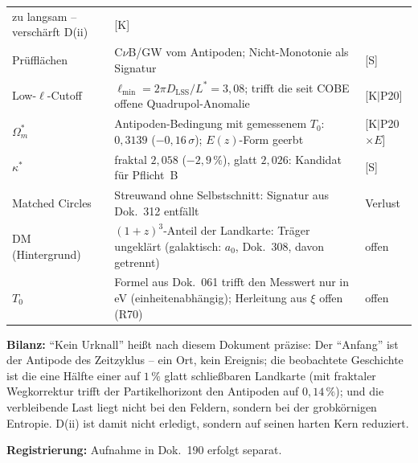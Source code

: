 {\begin{longtable}{lp{6.4cm}l}
  zu langsam -- verschärft D(ii) & [K] \\
Prüfflächen & C$\nu$B/GW vom Antipoden; Nicht-Monotonie als
  Signatur & [S] \\
Low-$\ell$-Cutoff & $\ell_\text{min} = 2\pi D_\text{LSS}/L^{*} =
  3{,}08$; trifft die seit COBE offene Quadrupol-Anomalie
  & [K$|$P20] \\
$\Omega_m^{*}$ & Antipoden-Bedingung mit gemessenem $T_0$:
  $0{,}3139$ ($-0{,}16\,\sigma$); $E(z)$-Form geerbt
  & [K$|$P20$\times$$E$] \\
$\kappa^{*}$ & fraktal $2{,}058$ ($-2{,}9\,\%$), glatt $2{,}026$:
  Kandidat für Pflicht~B & [S] \\
Matched Circles & Streuwand ohne Selbstschnitt: Signatur aus
  Dok.~312 entfällt & Verlust \\
DM (Hintergrund) & $(1{+}z)^3$-Anteil der Landkarte: Träger
  ungeklärt (galaktisch: $a_0$, Dok.~308, davon getrennt) & offen \\
$T_0$ & Formel aus Dok.~061 trifft den Messwert nur in eV
  (einheitenabhängig); Herleitung aus $\xi$ offen (R70) & offen \\
\end{longtable}
}

\medskip
\noindent\textbf{Bilanz:} \enquote{Kein Urknall} heißt nach diesem
Dokument präzise: Der \enquote{Anfang} ist der Antipode des
Zeitzyklus -- ein Ort, kein Ereignis; die beobachtete Geschichte
ist die eine Hälfte einer auf $1\,\%$ glatt schließbaren Landkarte
(mit fraktaler Wegkorrektur trifft der Partikelhorizont den
Antipoden auf $0{,}14\,\%$);
und die verbleibende Last liegt nicht bei den Feldern, sondern bei
der grobkörnigen Entropie. D(ii) ist damit nicht erledigt, sondern
auf seinen harten Kern reduziert.

\medskip
\noindent\textbf{Registrierung:} Aufnahme in Dok.~190 erfolgt
separat.


